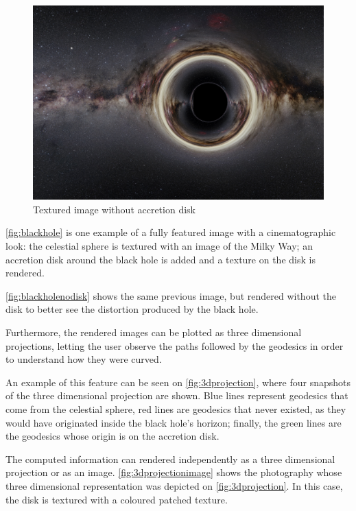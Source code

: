 \begin{figure}[bth]
	\myfloatalign
	\includegraphics[width=\linewidth]{gfx/bh_texture_nodisk}
	\caption[Textured image without accretion disk]{Textured image without accretion disk}
	\label{fig:blackholenodisk}
\end{figure}

\autoref{fig:blackhole} is one example of a fully featured image with a cinematographic look: the celestial sphere is textured with an image of the Milky Way; an accretion disk around the black hole is added and a texture on the disk is rendered.

\autoref{fig:blackholenodisk} shows the same previous image, but rendered without the disk to better see the distortion produced by the black hole.

Furthermore, the rendered images can be plotted as three dimensional projections, letting the user observe the paths followed by the geodesics in order to understand how they were curved.

An example of this feature can be seen on \autoref{fig:3dprojection}, where four snapshots of the three dimensional projection are shown. Blue lines represent geodesics that come from the celestial sphere, red lines are geodesics that never existed, as they would have originated inside the black hole's horizon; finally, the green lines are the geodesics whose origin is on the accretion disk.

The computed information can rendered independently as a three dimensional projection or as an image. \autoref{fig:3dprojectionimage} shows the photography whose three dimensional representation was depicted on \autoref{fig:3dprojection}. In this case, the disk is textured with a coloured patched texture.

